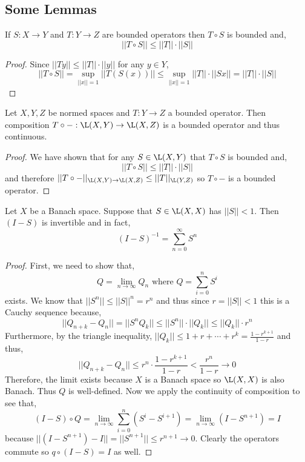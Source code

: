 \documentclass[12pt]{article}
\begin{document}
\subsection{Some Lemmas}

\begin{lemma}
If $S : X \to Y$ and $T : Y \to Z$ are bounded operators then $T \circ S$ is bounded and,
\[ || T \circ S || \le || T || \cdot || S || \]
\end{lemma}

\begin{proof}
Since $|| T y || \le || T || \cdot || y ||$ for any $y \in Y$,
\[ || T \circ S || = \sup_{|| x || = 1} || T(S(x)) || \le \sup_{|| x || = 1} ||T|| \cdot || S x || = || T || \cdot || S || \]
\end{proof}

\begin{lemma}
Let $X, Y, Z$ be normed spaces and $T : Y \to Z$ a bounded operator. Then composition $T \circ - : \L(X, Y) \to \L(X, Z)$ is a bounded operator and thus continuous.
\end{lemma}

\begin{proof}
We have shown that for any $S \in \L(X, Y)$ that $T \circ S$ is bounded and, 
\[ || T \circ S || \le || T || \cdot || S || \]
and therefore $|| T \circ - ||_{\L(X, Y) \to \L(X, Z)} \le || T ||_{\L(Y, Z)}$ so $T \circ -$ is a bounded operator. 
\end{proof}

\begin{lemma}
Let $X$ be a Banach space. Suppose that $S \in \L(X, X)$ has $|| S || < 1$. Then $(I - S)$ is invertible and in fact,
\[ (I - S)^{-1} = \sum_{n = 0}^{\infty} S^n \]
\end{lemma}

\begin{proof}
First, we need to show that, 
\[ Q = \lim_{n \to \infty} Q_n \text{ where } Q = \sum_{i = 0}^n S^i \] 
exists. We know that $|| S^n || \le || S ||^n = r^n$ and thus since $r = || S || < 1$ this is a Cauchy sequence because,
\[ || Q_{n + k} - Q_n || = || S^n Q_k || \le || S^n || \cdot || Q_k || \le || Q_k || \cdot r^n \]
Furthermore, by the triangle inequality, $|| Q_k || \le 1 + r + \cdots + r^k = \frac{1 - r^{k+1}}{1 - r}$ and thus,
\[ || Q_{n + k} - Q_n || \le r^n \cdot \frac{1 - r^{k+1}}{1 - r} < \frac{r^n}{1 - r} \to 0 \]
Therefore, the limit exists because $X$ is a Banach space so $\L(X, X)$ is also Banach. Thus $Q$ is well-defined. Now we apply the continuity of composition to see that,
\[ (I - S) \circ Q = \lim_{n \to \infty} \sum_{i = 0}^n (S^i - S^{i + 1}) = \lim_{n \to \infty} (I - S^{n+1}) = I \]
because $|| (I - S^{n+1}) - I || = || S^{n+1} || \le r^{n+1} \to 0$. Clearly the operators commute so $q \circ (I - S) = I$ as well. 
\end{proof}
\end{document}
